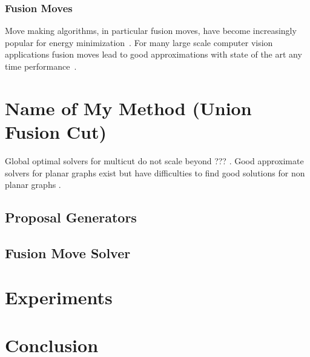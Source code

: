 \documentclass[10pt,twocolumn,letterpaper]{article}
\begin{document}
\subsubsection{Fusion Moves}
Move making algorithms, in particular fusion moves, 
have become increasingly popular for energy minimization~\cite{???,kappes_2014_ws}.
For many large scale computer vision applications fusion moves lead to good approximations
with state of the art any time performance~\cite{kappes_2014_ws}.








\section{Name of My Method (Union Fusion Cut)}

Global optimal solvers for multicut do not scale beyond ??? \cite{???}.
Good approximate solvers for planar graphs exist \cite{beier_2014_cvpr,yarkony_2012_eccv} 
but have difficulties to find good solutions for non planar graphs \cite{beier_2014_cvpr}.









\subsection{Proposal Generators}



\subsection{Fusion Move Solver}


\section{Experiments}

\section{Conclusion}

    



{\small


}
\end{document}
